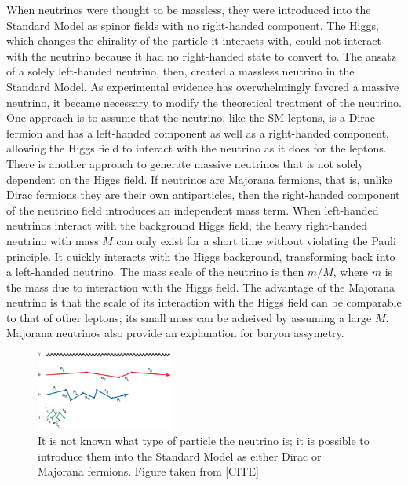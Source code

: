 When neutrinos were thought to be massless, they were introduced into the Standard Model as spinor fields with no right-handed component.  The Higgs, which changes the chirality of the particle it interacts with, could not interact with the neutrino because it had no right-handed state to convert to.  The ansatz of a solely left-handed neutrino, then, created a massless neutrino in the Standard Model.  As experimental evidence has overwhelmingly favored a massive neutrino, it became necessary to modify the theoretical treatment of the neutrino.  One approach is to assume that the neutrino, like the SM leptons, is a Dirac fermion and has a left-handed component as well as a right-handed component, allowing the Higgs field to interact with the neutrino as it does for the leptons.  There is another approach to generate massive neutrinos that is not solely dependent on the Higgs field.  If neutrinos are Majorana fermions, that is, unlike Dirac fermions they are their own antiparticles, then the right-handed component of the neutrino field introduces an independent mass term.  When left-handed neutrinos interact with the background Higgs field, the heavy right-handed neutrino with mass $M$ can only exist for a short time without violating the Pauli principle.  It quickly interacts with the Higgs background, transforming back into a left-handed neutrino.  The mass scale of the neutrino is then $m/M$, where $m$ is the mass due to interaction with the Higgs field.  The advantage of the Majorana neutrino is that the scale of its interaction with the Higgs field can be comparable to that of other leptons; its small mass can be acheived by assuming a large $M$.  Majorana neutrinos also provide an explanation for baryon assymetry.  
\begin{figure}[htp]
\centering
\includegraphics[width=0.4\textwidth]{figures/leptonMass.eps}
\caption{It is not known what type of particle the neutrino is; it is possible to introduce them into the Standard Model as either Dirac or Majorana fermions.  Figure taken from [CITE]}
\end{figure}  

